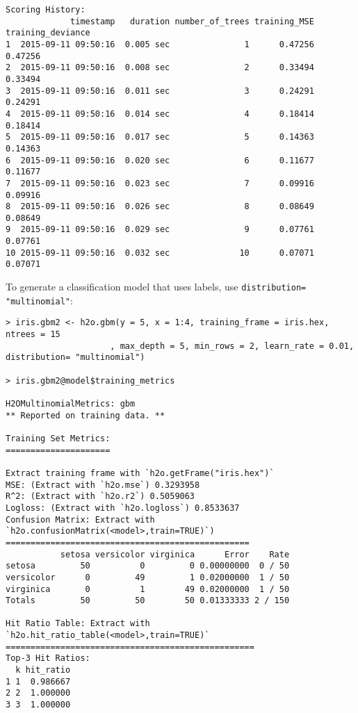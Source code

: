 {\begin{lstlisting}[style=R]
Scoring History:
             timestamp   duration number_of_trees training_MSE training_deviance
1  2015-09-11 09:50:16  0.005 sec               1      0.47256           0.47256
2  2015-09-11 09:50:16  0.008 sec               2      0.33494           0.33494
3  2015-09-11 09:50:16  0.011 sec               3      0.24291           0.24291
4  2015-09-11 09:50:16  0.014 sec               4      0.18414           0.18414
5  2015-09-11 09:50:16  0.017 sec               5      0.14363           0.14363
6  2015-09-11 09:50:16  0.020 sec               6      0.11677           0.11677
7  2015-09-11 09:50:16  0.023 sec               7      0.09916           0.09916
8  2015-09-11 09:50:16  0.026 sec               8      0.08649           0.08649
9  2015-09-11 09:50:16  0.029 sec               9      0.07761           0.07761
10 2015-09-11 09:50:16  0.032 sec              10      0.07071           0.07071
\end{lstlisting}

To generate a classification model that uses labels, use {\texttt{distribution= "multinomial"}}: 
\smallskip
\begin{lstlisting}[style=R]
> iris.gbm2 <- h2o.gbm(y = 5, x = 1:4, training_frame = iris.hex, ntrees = 15
                     , max_depth = 5, min_rows = 2, learn_rate = 0.01, distribution= "multinomial")
   
> iris.gbm2@model$training_metrics

H2OMultinomialMetrics: gbm
** Reported on training data. **

Training Set Metrics: 
=====================

Extract training frame with `h2o.getFrame("iris.hex")`
MSE: (Extract with `h2o.mse`) 0.3293958
R^2: (Extract with `h2o.r2`) 0.5059063
Logloss: (Extract with `h2o.logloss`) 0.8533637
Confusion Matrix: Extract with `h2o.confusionMatrix(<model>,train=TRUE)`)
=================================================
           setosa versicolor virginica      Error    Rate
setosa         50          0         0 0.00000000  0 / 50
versicolor      0         49         1 0.02000000  1 / 50
virginica       0          1        49 0.02000000  1 / 50
Totals         50         50        50 0.01333333 2 / 150

Hit Ratio Table: Extract with `h2o.hit_ratio_table(<model>,train=TRUE)`
==================================================
Top-3 Hit Ratios:
  k hit_ratio
1 1  0.986667
2 2  1.000000
3 3  1.000000

\end{lstlisting}

}
